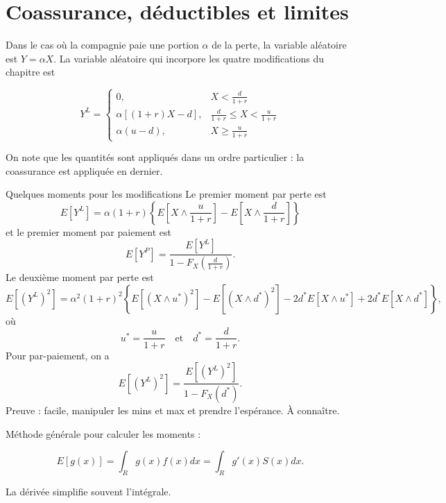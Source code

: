 \section{Coassurance, déductibles et limites}

Dans le cas où la compagnie paie une portion $\alpha$ de la perte, la variable aléatoire est $Y = \alpha X$. La variable aléatoire qui incorpore les quatre modifications du chapitre est 

$$Y^L = \begin{cases}
0,& X< \frac{d}{1 + r}\\
\alpha \left[(1 + r)X - d\right],& \frac{d}{1 + r} \leq X < \frac{u}{1 + r}\\
\alpha(u-d), & X\geq \frac{u}{1 + r}
\end{cases}$$

On note que les quantités sont appliqués dans un ordre particulier : la coassurance est appliquée en dernier. 

\begin{theoreme}{Quelques moments pour les modifications}{}
Le premier moment par perte est
$$E\left[Y^L\right] = \alpha(1 + r)\left\{ E\left[X \wedge \frac{u}{1 + r}\right] - E\left[X \wedge \frac{d}{1 + r}\right]\right\}$$
et le premier moment par paiement est
$$E\left[Y^P\right] = \frac{E\left[Y^L\right]}{1 - F_{X}\left(\frac{d}{1 + r}\right)}.$$
\tcblower
Le deuxième moment par perte est
$$E\left[\left(Y^L\right)^2\right] = \alpha^2 (1 + r)^2 \left\{ E\left[(X \wedge u^*)^2\right]-E\left[(X \wedge d^*)^2\right] -2d^*E\left[X \wedge u^*\right] + 2d^*E\left[X \wedge d^*\right]\right\},$$
où $$u^* = \frac{u}{1 + r} \quad \text{et}\quad d^* = \frac{d}{1 + r}.$$
Pour par-paiement, on a 
$$E\left[\left(Y^L\right)^2\right] = \frac{E\left[\left(Y^L\right)^2\right]}{1 - F_{X}\left(d^*\right)}.$$
Preuve : facile, manipuler les mins et max et prendre l'espérance. À connaître. 
\end{theoreme}

Méthode générale pour calculer les moments : 

$$E[g(x)] = \int_{R} g(x) f(x) dx = \int_{R}g'(x)S(x) dx.$$

La dérivée simplifie souvent l'intégrale. 





